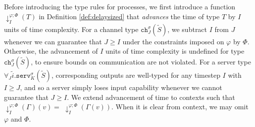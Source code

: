Before introducing the type rules for processes, we first introduce a function $\downarrow^{\varphi;\Phi}_I\!\!(T)$ in Definition \ref{def:delaysized} that \textit{advances} the time of type $T$ by $I$ units of time complexity. For a channel type $\texttt{ch}^\sigma_J(\widetilde{S})$, we subtract $I$ from $J$ whenever we can guarantee that $J\geq I$ under the constraints imposed on $\varphi$ by $\Phi$. Otherwise, the advancement of $I$ units of time complexity is undefined for type $\texttt{ch}^\sigma_J(\widetilde{S})$, to ensure bounds on communication are not violated. For a server type $\forall_J\widetilde{i}.\texttt{serv}^\sigma_K(\widetilde{S})$, corresponding outputs are well-typed for any timestep $I$ with $I\geq J$, and so a server simply loses input capability whenever we cannot guarantee that $J \geq I$. We extend advancement of time to contexts such that $\downarrow^{\varphi;\Phi}_I(\Gamma)(v)=\;\downarrow^{\varphi;\Phi}_I(\Gamma(v))$. When it is clear from context, we may omit $\varphi$ and $\Phi$.

